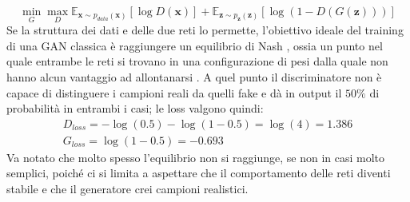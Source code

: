 \documentclass[Lau, noexaminfo, oneside]{sapthesis} %
\begin{document}
\begin{equation}
\min _{G}\max _{D}\mathbb {E} _{{\boldsymbol {x}}\sim p_{data}({\boldsymbol {x}})}[\log D({\boldsymbol {x}})]+\mathbb {E} _{{\boldsymbol {z}}\sim p_{\boldsymbol {z}}({\boldsymbol {z}})}[\log(1-D(G({\boldsymbol {z}})))]
\end{equation}
Se la struttura dei dati e delle due reti lo permette, l'obiettivo ideale del training di una GAN classica è raggiungere un equilibrio di Nash
\cite{Nash48}, ossia un punto nel quale entrambe le reti si trovano in una configurazione di pesi dalla quale non hanno alcun vantaggio ad allontanarsi . A quel punto il discriminatore non è capace di distinguere i campioni reali da quelli fake e dà in output il $50\%$ di probabilità in entrambi i casi; le loss valgono quindi:
\begin{align}
D_{loss} = - \log(0.5) - \log(1 - 0.5) = \log(4) = 1.386\\
G_{loss} = \log(1- 0.5) = - 0.693 
\end{align}
Va notato che molto spesso l'equilibrio non si raggiunge, se non in casi molto semplici, poiché ci si limita a aspettare che il comportamento delle reti diventi stabile e che il generatore crei campioni realistici.
\end{document}
